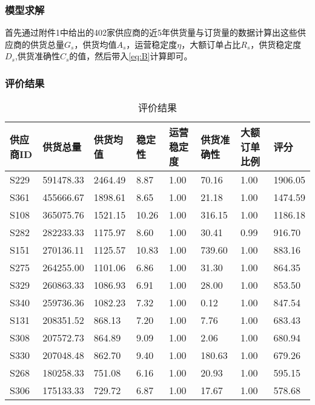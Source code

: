 \documentclass[withoutpreface,bwprint]{cumcmthesis} %
\begin{document}
\subsubsection{模型求解}

首先通过附件1中给出的402家供应商的近5年供货量与订货量的数据计算出这些供应商的供货总量$G_s$，供货均值$A_s$，运营稳定度$\eta$，大额订单占比$R_s$，供货稳定度$D_s$,供货准确性$C_s$的值，然后带入\cref{eq:B}计算即可。
\subsubsection{评价结果}

\begin{longtable}{|l|l|l|l|l|l|l|l|}
\caption{评价结果}
\label{tab:ping} \\
\hline
        供应商ID & 供货总量 & 供货均值 & 稳定性 & 运营稳定度 & 供货准确性 & 大额订单比例 & 评分 \\ \hline
        S229 & 591478.33  & 2464.49  & 8.87  & 1.00  & 70.16  & 1.00  & 1906.05  \\ \hline
        S361 & 455666.67  & 1898.61  & 8.65  & 1.00  & 21.18  & 1.00  & 1474.59  \\ \hline
        S108 & 365075.76  & 1521.15  & 10.26  & 1.00  & 316.15  & 1.00  & 1186.18  \\ \hline
        S282 & 282233.33  & 1175.97  & 8.60  & 1.00  & 30.41  & 0.99  & 916.70  \\ \hline
        S151 & 270136.11  & 1125.57  & 10.83  & 1.00  & 739.60  & 1.00  & 883.16  \\ \hline
        S275 & 264255.00  & 1101.06  & 6.86  & 1.00  & 31.30  & 1.00  & 864.35  \\ \hline
        S329 & 260863.33  & 1086.93  & 6.91  & 1.00  & 28.00  & 1.00  & 853.50  \\ \hline
        S340 & 259736.36  & 1082.23  & 7.32  & 1.00  & 0.12  & 1.00  & 847.54  \\ \hline
        S131 & 208351.52  & 868.13  & 7.20  & 1.00  & 7.76  & 1.00  & 683.43  \\ \hline
        S308 & 207572.73  & 864.89  & 9.09  & 1.00  & 2.06  & 1.00  & 680.94  \\ \hline
        S330 & 207048.48  & 862.70  & 9.40  & 1.00  & 180.63  & 1.00  & 679.26  \\ \hline
        S268 & 180258.33  & 751.08  & 6.16  & 1.00  & 20.93  & 1.00  & 595.15  \\ \hline
        S306 & 175133.33  & 729.72  & 6.87  & 1.00  & 17.67  & 1.00  & 578.68  \\ \hline

\end{longtable}
\end{document}
